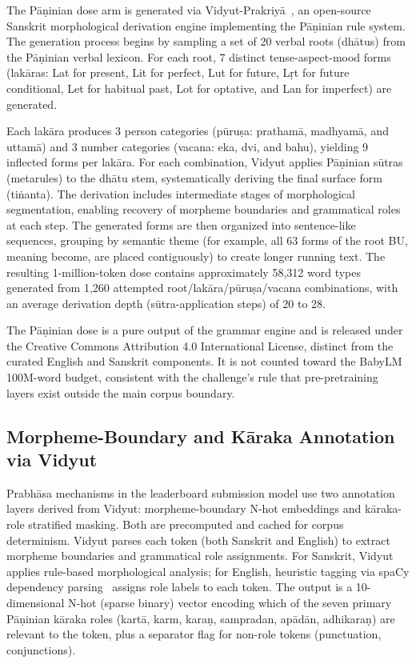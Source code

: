The Pāṇinian dose arm is generated via Vidyut-Prakriyā~\cite{Prasad2024Vidyut}, an open-source Sanskrit morphological derivation engine implementing the Pāṇinian rule system. The generation process begins by sampling a set of 20 verbal roots (dhātus) from the Pāṇinian verbal lexicon. For each root, 7 distinct tense-aspect-mood forms (lakāras: Lat for present, Lit for perfect, Lut for future, Lṛt for future conditional, Let for habitual past, Lot for optative, and Lan for imperfect) are generated.

Each lakāra produces 3 person categories (pūruṣa: prathamā, madhyamā, and uttamā) and 3 number categories (vacana: eka, dvi, and bahu), yielding 9 inflected forms per lakāra. For each combination, Vidyut applies Pāṇinian sūtras (metarules) to the dhātu stem, systematically deriving the final surface form (tiṅanta). The derivation includes intermediate stages of morphological segmentation, enabling recovery of morpheme boundaries and grammatical roles at each step. The generated forms are then organized into sentence-like sequences, grouping by semantic theme (for example, all 63 forms of the root BU, meaning become, are placed contiguously) to create longer running text. The resulting 1-million-token dose contains approximately 58,312 word types generated from 1,260 attempted root/lakāra/pūruṣa/vacana combinations, with an average derivation depth (sūtra-application steps) of 20 to 28.

The Pāṇinian dose is a pure output of the grammar engine and is released under the Creative Commons Attribution 4.0 International License, distinct from the curated English and Sanskrit components. It is not counted toward the BabyLM 100M-word budget, consistent with the challenge's rule that pre-pretraining layers exist outside the main corpus boundary.

\subsection{Morpheme-Boundary and Kāraka Annotation via Vidyut}

Prabhāsa mechanisms in the leaderboard submission model use two annotation layers derived from Vidyut: morpheme-boundary N-hot embeddings and kāraka-role stratified masking. Both are precomputed and cached for corpus determinism. Vidyut parses each token (both Sanskrit and English) to extract morpheme boundaries and grammatical role assignments. For Sanskrit, Vidyut applies rule-based morphological analysis; for English, heuristic tagging via spaCy dependency parsing~\cite{Honnibal2020spaCy} assigns role labels to each token. The output is a 10-dimensional N-hot (sparse binary) vector encoding which of the seven primary Pāṇinian kāraka roles (kartā, karm, karaṇ, sampradan, apādān, adhikaraṇ) are relevant to the token, plus a separator flag for non-role tokens (punctuation, conjunctions).

